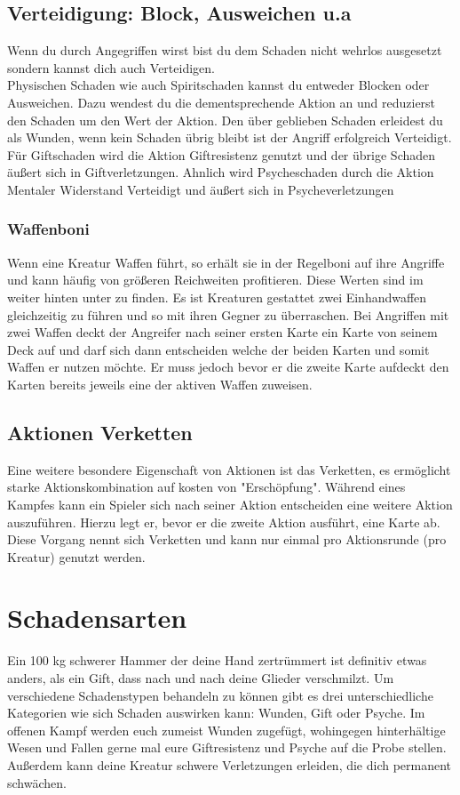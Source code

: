 \subsection*{Verteidigung: Block, Ausweichen u.a}
Wenn du durch Angegriffen wirst bist du dem Schaden nicht wehrlos ausgesetzt sondern kannst dich auch Verteidigen.\\
Physischen Schaden wie auch Spiritschaden kannst du entweder Blocken oder Ausweichen. Dazu wendest du die dementsprechende Aktion an und reduzierst den Schaden um den Wert der Aktion. Den über geblieben Schaden erleidest du als Wunden, wenn kein Schaden übrig bleibt ist der Angriff erfolgreich Verteidigt. Für Giftschaden wird die Aktion Giftresistenz genutzt und der übrige Schaden äußert sich in Giftverletzungen. Ahnlich wird Psycheschaden durch die Aktion Mentaler Widerstand Verteidigt und äußert sich in Psycheverletzungen


\subsubsection*{Waffenboni}
Wenn eine Kreatur Waffen führt, so erhält sie in der Regelboni auf ihre Angriffe und kann häufig von größeren Reichweiten profitieren. Diese Werten sind im weiter hinten unter \textit{} zu finden. Es ist Kreaturen gestattet zwei Einhandwaffen gleichzeitig zu führen und so mit ihren Gegner zu überraschen. Bei Angriffen mit zwei Waffen deckt der Angreifer nach seiner ersten Karte ein Karte von seinem Deck auf und darf sich dann entscheiden welche der beiden Karten und somit Waffen er nutzen möchte. Er muss jedoch bevor er die zweite Karte aufdeckt den Karten bereits jeweils eine der aktiven Waffen zuweisen.

\subsection*{Aktionen Verketten}
Eine weitere besondere Eigenschaft von Aktionen ist das Verketten, es ermöglicht starke Aktionskombination auf kosten von "Erschöpfung". Während eines Kampfes kann ein Spieler sich nach seiner Aktion entscheiden eine weitere Aktion auszuführen. Hierzu legt er, bevor er die zweite Aktion ausführt, eine Karte ab. Diese Vorgang nennt sich Verketten und kann nur einmal pro Aktionsrunde (pro Kreatur) genutzt werden.


\section{Schadensarten}
Ein 100 kg schwerer Hammer der deine Hand zertrümmert ist definitiv etwas anders, als ein Gift, dass nach und nach deine Glieder verschmilzt. Um verschiedene Schadenstypen behandeln zu können gibt es drei unterschiedliche Kategorien wie sich Schaden auswirken kann: Wunden, Gift oder Psyche. Im offenen Kampf werden euch zumeist Wunden zugefügt, wohingegen hinterhältige Wesen und Fallen gerne mal eure Giftresistenz und Psyche auf die Probe stellen. Außerdem kann deine Kreatur schwere Verletzungen erleiden, die dich permanent schwächen.

